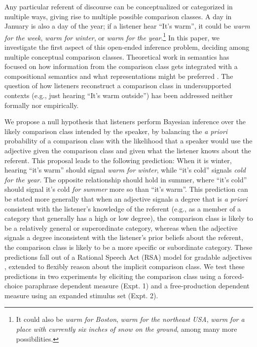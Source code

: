 \documentclass[doc]{apa6}
\begin{document}
Any particular referent of discourse can be conceptualized or categorized in
multiple ways, giving rise to multiple possible comparison classes. A day in
January is also a day of the year; if a listener hear ``It's
warm'', it could be \emph{warm for the week}, \emph{warm for winter}, or
\emph{warm for the year}.\footnote{It could also be \emph{warm for
  Boston}, \emph{warm for the northeast USA}, \emph{warm for a place
  with currently six inches of snow on the ground}, among many more
  possibilities. } In this paper, we investigate the first aspect of
this open-ended inference problem, deciding among multiple conceptual comparison
classes. Theoretical work in semantics has focused on how information
from the comparison class gets integrated with a compositional semantics
and what representations might be preferred \cite{Bale2011, Solt2009}.
The question of how listeners reconstruct a comparison class in
undersupported contexts (e.g., just hearing ``It's warm outside'')
has been addressed neither formally nor empirically.

We propose a null hypothesis that listeners perform Bayesian inference over the likely comparison class intended by the speaker, by balancing the \emph{a priori} probability of a comparison class with the likelihood that a speaker would use the adjective given the comparison class and given what the listener knows about the referent. 
This proposal leads to the following prediction: When it is
winter, hearing ``it's warm'' should signal \emph{warm for
winter}, while ``it's cold'' signals \emph{cold for the
year}. The opposite relationship should hold in summer, where
``it's cold'' should signal it's cold \emph{for summer} more so
than ``it's warm''. This prediction can be stated more generally that when an adjective signals a degree that is \emph{a priori} consistent with  the listener's knowledge of the referent (e.g., as a member of a category that generally has a high or low degree), the comparison class is likely to be a relatively general or superordinate category, whereas when the adjective signals a degree inconsistent with the listener's prior beliefs about the referent, the comparison class is likely to be a more specific or subordinate category. 
These predictions fall out of a Rational Speech Act (RSA) model for gradable
adjectives \cite{Lassiter2013, Lassiter2017}, extended to flexibly
reason about the implicit comparison class. We test these predictions in
two experiments by eliciting the comparison class using a forced-choice
paraphrase dependent measure (Expt. 1) and a free-production dependent
measure using an expanded stimulus set (Expt. 2).
\end{document}
